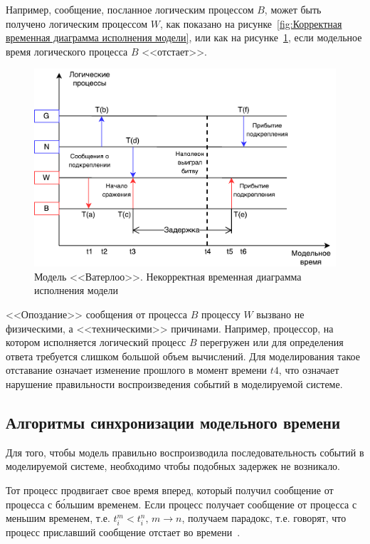 Например, сообщение, посланное логическим процессом $B$, может быть получено логическим процессом $W$, как показано на рисунке~\ref{fig:Корректная временная диаграмма исполнения модели}, или как на рисунке~\ref{fig:Некорректная временная диаграмма исполнения модели}, если модельное время логического процесса $B$ <<отстает>>.

\begin{figure}[!ht]
\centering
\includegraphics[scale=1]{images/waterloo-kas.pdf}
\caption{Модель <<Ватерлоо>>. Некорректная временная диаграмма исполнения модели}
\label{fig:Некорректная временная диаграмма исполнения модели}
\end{figure}

<<Опоздание>> сообщения от процесса $B$  процессу $W$ вызвано не физическими, а <<техническими>> причинами. Например, процессор, на котором исполняется логический процесс $B$ перегружен или для определения ответа требуется слишком большой объем вычислений. Для моделирования такое отставание означает изменение прошлого в момент времени $t4$, что означает нарушение правильности воспроизведения событий в моделируемой системе.

\subsection{Алгоритмы синхронизации модельного времени}

Для того, чтобы модель правильно воспроизводила последовательность событий в моделируемой системе, необходимо чтобы подобных задержек не возникало.

Тот процесс продвигает свое время вперед, который получил сообщение от процесса с б\'ольшим временем. Если процесс получает сообщение от процесса с меньшим временем, т.е. $t_i^m<t_i^n, \, m \to n$, получаем парадокс, т.е. говорят, что процесс приславший сообщение  отстает во времени~\cite{okol}.

